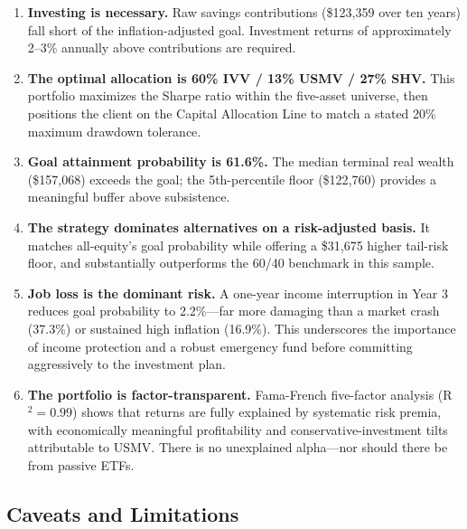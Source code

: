 \documentclass[12pt, letterpaper]{article}
\begin{document}
\begin{enumerate}
  \item \textbf{Investing is necessary.} Raw savings contributions (\$123{,}359 over
    ten years) fall short of the inflation-adjusted goal.  Investment returns of
    approximately 2--3\% annually above contributions are required.
  \item \textbf{The optimal allocation is 60\% IVV / 13\% USMV / 27\% SHV.}
    This portfolio maximizes the Sharpe ratio within the five-asset universe,
    then positions the client on the Capital Allocation Line to match a stated
    20\% maximum drawdown tolerance.
  \item \textbf{Goal attainment probability is 61.6\%.} The median terminal real
    wealth (\$157{,}068) exceeds the goal; the 5th-percentile floor (\$122{,}760)
    provides a meaningful buffer above subsistence.
  \item \textbf{The strategy dominates alternatives on a risk-adjusted basis.}
    It matches all-equity's goal probability while offering a \$31{,}675 higher
    tail-risk floor, and substantially outperforms the 60/40 benchmark in this sample.
  \item \textbf{Job loss is the dominant risk.}  A one-year income interruption in
    Year 3 reduces goal probability to 2.2\%---far more damaging than a market crash
    (37.3\%) or sustained high inflation (16.9\%).  This underscores the importance
    of income protection and a robust emergency fund before committing aggressively
    to the investment plan.
  \item \textbf{The portfolio is factor-transparent.} Fama-French five-factor analysis
    (R$^2 = 0.99$) shows that returns are fully explained by systematic risk premia,
    with economically meaningful profitability and conservative-investment tilts
    attributable to USMV.  There is no unexplained alpha---nor should there be from
    passive ETFs.
\end{enumerate}

\subsection{Caveats and Limitations}
\end{document}
